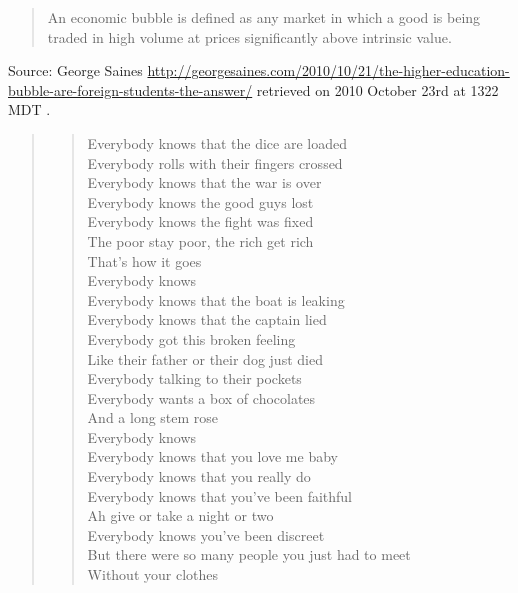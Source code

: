 \documentclass[a4paper]{article}
\begin{document}
\begin{quote}
	An economic bubble is defined as any market in which a good
	is being traded in high volume at prices significantly above
	intrinsic value.
\end{quote}
Source: George Saines
\url{http://georgesaines.com/2010/10/21/the-higher-education-bubble-are-foreign-students-the-answer/}
retrieved on 2010 October 23rd at 1322 MDT \citep{Saines2010}.
\medskip

\begin{quote}
	\begin{verse}
		\begin{centering}
			Everybody knows that the dice are loaded \\
			Everybody rolls with their fingers crossed \\
			Everybody knows that the war is over \\
			Everybody knows the good guys lost \\
			Everybody knows the fight was fixed \\
			The poor stay poor, the rich get rich \\
			That's how it goes \\
			Everybody knows \\
			Everybody knows that the boat is leaking \\
			Everybody knows that the captain lied \\
			Everybody got this broken feeling \\
			Like their father or their dog just died \\
		\vspace{.1in}
			Everybody talking to their pockets \\
			Everybody wants a box of chocolates \\
			And a long stem rose \\
			Everybody knows \\
		\vspace{.1in}
			Everybody knows that you love me baby \\
			Everybody knows that you really do \\
			Everybody knows that you've been faithful \\
			Ah give or take a night or two \\
			Everybody knows you've been discreet \\
			But there were so many people you just had to meet \\
			Without your clothes \\

\end{centering}
\end{verse}
\end{quote}
\end{document}
